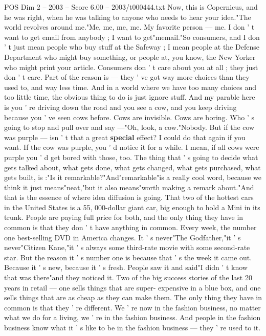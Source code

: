 \begin{textsample}{POS Dim 2 – 2003 – Score 6.00 – 2003/t000444.txt}
Now, this is Copernicus, and he was right, when he was talking to anyone who needs to hear your idea."The world revolves around me."Me, me, me, me.
My favorite person — me.
I don ' t want to get email from anybody ; I want to get"memail."So consumers, and I don ' t just mean people who buy stuff at the Safeway ; I mean people at the Defense Department who might buy something, or people at, you know, the New Yorker who might print your article.
Consumers don ' t care about you at all ; they just don ' t care.
Part of the reason is — they ' ve got way more choices than they used to, and way less time.
And in a world where we have too many choices and too little time, the obvious thing to do is just ignore stuff.
And my parable here is you ' re driving down the road and you see a cow, and you keep driving because you ' ve seen cows before.
Cows are invisible.
Cows are boring.
Who ' s going to stop and pull over and say —"Oh, look, a cow."Nobody.
But if the cow was purple — isn ' t that a great \textbf{special} effect?
I could do that again if you want.
If the cow was purple, you ' d notice it for a while.
I mean, if all cows were purple you ' d get bored with those, too.
The thing that ' s going to decide what gets talked about, what gets done, what gets changed, what gets purchased, what gets built, is :"Is it remarkable?"And"remarkable"is a really cool word, because we think it just means"neat,"but it also means"worth making a remark about."And that is the essence of where idea diffusion is going.
That two of the hottest cars in the United States is a 55, 000-dollar giant car, big enough to hold a Mini in its trunk.
People are paying full price for both, and the only thing they have in common is that they don ' t have anything in common.
Every week, the number one best-selling DVD in America changes.
It ' s never"The Godfather,"it ' s never"Citizen Kane,"it ' s always some third-rate movie with some second-rate star.
But the reason it ' s number one is because that ' s the week it came out.
Because it ' s new, because it ' s fresh.
People saw it and said"I didn ' t know that was there"and they noticed it.
Two of the big success stories of the last 20 years in retail — one sells things that are super- expensive in a blue box, and one sells things that are as cheap as they can make them.
The only thing they have in common is that they ' re different.
We ' re now in the fashion business, no matter what we do for a living, we ' re in the fashion business.
And people in the fashion business know what it ' s like to be in the fashion business — they ' re used to it.

\end{textsample}
